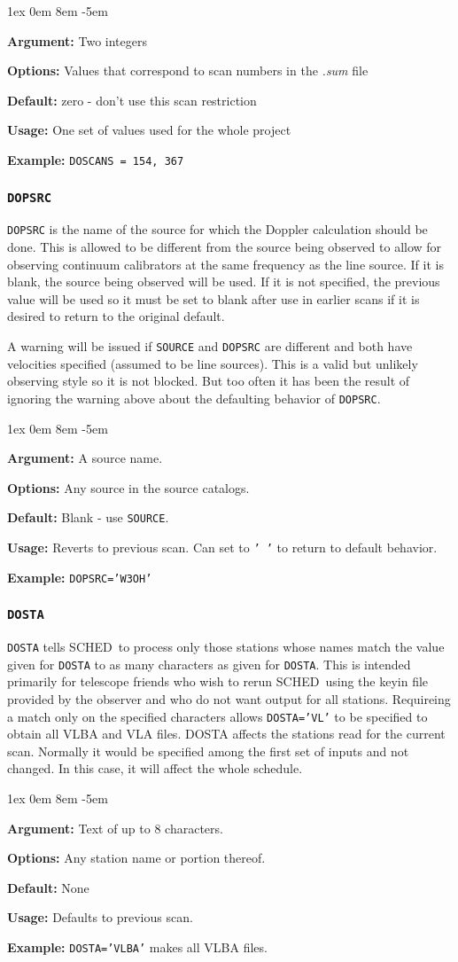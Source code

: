 \documentclass{report}
\newcommand{\schedb}{{\sc SCHED~}}
\newcommand{\rcwbox}[5]{
  \begin{list}{}{\parsep 1ex  \itemsep 0em
                 \leftmargin 8em  \itemindent -5em }
    \item {\bf Argument:} #1
    \item {\bf Options:}  #2
    \item {\bf Default:}  #3
    \item {\bf Usage:}    #4
    \item {\bf Example:}  #5
  \end{list}
}
\begin{document}
\rcwbox
{Two integers}
{Values that correspond to scan numbers in the {\sl .sum} file}
{zero - don't use this scan restriction}
{One set of values used for the whole project}
{{\tt DOSCANS = 154, 367}}


\subsubsection{\label{MP:DOPSRC}{\tt DOPSRC}}

{\tt DOPSRC} is the name of the source for which the Doppler
calculation should be done. This is allowed to be different from the
source being observed to allow for observing continuum calibrators at
the same frequency as the line source. If it is blank, the source
being observed will be used. If it is not specified, the previous
value will be used so it must be set to blank after use in earlier
scans if it is desired to return to the original default.

A warning will be issued if {\tt SOURCE} and {\tt DOPSRC} are
different and both have velocities specified (assumed to be line
sources).   This is a valid but unlikely observing style so it
is not blocked.  But too often it has been the result of ignoring
the warning above about the defaulting behavior of {\tt DOPSRC}.

\rcwbox
{A source name.}
{Any source in the source catalogs.}
{Blank - use {\tt SOURCE}.}
{Reverts to previous scan. Can set to {\tt ' '} to return to default
behavior.}
{{\tt DOPSRC='W3OH'}}

\subsubsection{\label{MP:DOSTA}{\tt DOSTA}}

{\tt DOSTA} tells \schedb to process only those stations whose
names match the value given for {\tt DOSTA} to as many characters as
given for {\tt DOSTA}. This is intended primarily for telescope
friends who wish to rerun \schedb using the keyin file provided by
the observer and who do not want output for all stations. Requireing a
match only on the specified characters allows {\tt DOSTA='VL'} to be
specified to obtain all VLBA and VLA files.  DOSTA affects the
stations read for the current scan.  Normally it would be specified
among the first set of inputs and not changed.  In this case, it will
affect the whole schedule.

\rcwbox
{Text of up to 8 characters.}
{Any station name or portion thereof.}
{None}
{Defaults to previous scan.}
{{\tt DOSTA='VLBA'} makes all VLBA files.}
\end{document}
